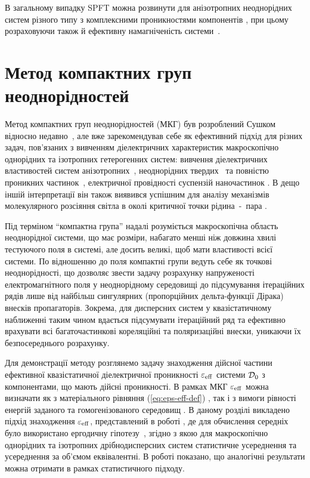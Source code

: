 \documentclass[14pt,twoside]{vakthesis}
\begin{document}
В загальному випадку SPFT можна розвинути для анізотропних неоднорідних систем різного типу з комплексними проникностями компонентів \cite{RyzhovRev,Tsang1981}, при цьому розраховуючи також й ефективну намагніченість системи~\cite{Mackay2000}.


\section{Метод компактних груп неоднорідностей}\label{sec:CGA}

Метод компактних груп неоднорідностей (МКГ) був розроблений Сушком відносно недавно~\cite{Sushko2004, Sushko2007, SushkoJPD2009, Sushko2017}, але вже зарекомендував себе як ефективний підхід для різних задач, пов'язаних з вивченням діелектричних характеристик макроскопічно однорідних та ізотропних гетерогенних систем: вивчення діелектричних властивостей систем анізотропних~\cite{SushkoJPD2009}, неоднорідних твердих~\cite{Sushko2017} та повністю проникних частинок~\cite{Sushko2018EPJ}, електричної провідності суспензій наночастинок \cite{Sushko2016}. В дещо іншій інтерпретації він також виявився успішним  для аналізу механізмів молекулярного розсіяння світла в околі критичної точки рідина~-~пара \cite{Sushko2004, SushkoFNT2007, SushkoJML2011, SushkoCMP2013}.

Під терміном ``компактна група'' надалі розуміється макроскопічна область неоднорідної системи, що має розміри, набагато менші ніж довжина хвилі тестуючого поля в системі, але досить великі, щоб мати властивості всієї системи. По відношенню до поля компактні групи ведуть себе як точкові неоднорідності, що дозволяє звести задачу розрахунку напруженості електромагнітного поля у неоднорідному середовищі до підсумування ітераційних рядів лише від найбільш сингулярних (пропорційних дельта-функції Дірака) внесків пропагаторів. Зокрема, для дисперсних систем у квазістатичному наближенні таким чином вдається підсумувати ітераційний ряд та ефективно врахувати всі багаточастинкові кореляційні та поляризаційні внески, уникаючи їх безпосереднього розрахунку. 

Для демонстрації методу розглянемо задачу знаходження дійсної частини ефективної квазістатичної діелектричної проникності $\varepsilon_{\rm eff}$ системи ${\cal D}_0$ з компонентами, що мають дійсні проникності.
В рамках МКГ $\varepsilon_{\rm eff}$ можна визначати як з матеріального рівняння (\ref{eq:eps-eff-def}) \cite{Sushko2007}, так і з вимоги рівності енергій заданого та гомогенізованого середовищ \cite{Sushko2017}. В даному розділі викладено підхід знаходження $\varepsilon_{\rm eff}$, представлений в роботі \cite{Sushko2007}, де для обчислення середніх було використано ергодичну гіпотезу~\cite{Torquato,LandauT8}, згідно з якою для макроскопічно однорідних та ізотропних дрібнодисперсних систем статистичне усереднення та усереднення за об'ємом еквівалентні. В роботі \cite{Sushko2017} показано, що аналогічні результати можна отримати в рамках статистичного підходу.
\end{document}

